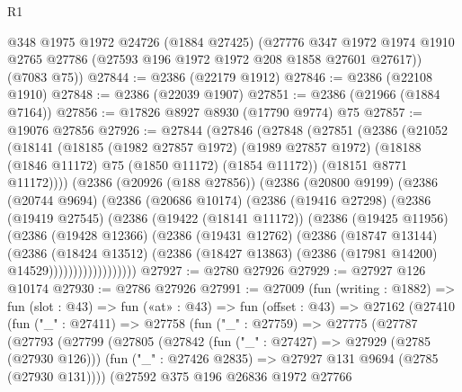 \begin{lexlean}{R1}
\begin{coremodule}
      @348
      @1975
      @1972
      @24726
      (@1884 @27425)
      (@27776
        @347
        @1972
        @1974
        @1910
        @2765
        @27786
        (@27593 @196 @1972 @1972 @208 @1858 @27601 @27617))
      (@7083 @75))
@27844 := @2386 (@22179 @1912)
@27846 := @2386 (@22108 @1910)
@27848 := @2386 (@22039 @1907)
@27851 := @2386 (@21966 (@1884 @7164))
@27856 := @17826 @8927 @8930 (@17790 @9774) @75
@27857 := @19076 @27856
@27926 := @27844
    (@27846
      (@27848
        (@27851
          (@2386
            (@21052
              (@18141
                (@18185
                  (@1982 @27857 @1972)
                  (@1989 @27857 @1972)
                  (@18188 (@1846 @11172) @75 (@1850 @11172) (@1854 @11172))
                  (@18151 @8771 @11172))))
            (@2386
              (@20926 (@188 @27856))
              (@2386
                (@20800 @9199)
                (@2386
                  (@20744 @9694)
                  (@2386
                    (@20686 @10174)
                    (@2386
                      (@19416 @27298)
                      (@2386
                        (@19419 @27545)
                        (@2386
                          (@19422 (@18141 @11172))
                          (@2386
                            (@19425 @11956)
                            (@2386
                              (@19428 @12366)
                              (@2386
                                (@19431 @12762)
                                (@2386
                                  (@18747 @13144)
                                  (@2386
                                    (@18424 @13512)
                                    (@2386
                                      (@18427 @13863)
                                      (@2386 (@17981 @14200) @14529))))))))))))))))))
@27927 := @2780 @27926
@27929 := @27927 @126 @10174
@27930 := @2786 @27926
@27991 := @27009
    (fun (writing : @1882) =>
    fun (slot : @43) =>
    fun («at» : @43) =>
    fun (offset : @43) =>
    @27162
      (@27410
        (fun ("_" : @27411) =>
        @27758
          (fun ("_" : @27759) =>
          @27775
            (@27787
              (@27793
                (@27799
                  (@27805
                    (@27842
                      (fun ("_" : @27427) => @27929 (@2785 (@27930 @126)))
                      (fun ("_" : @27426 @2835) => @27927 @131 @9694 (@2785 (@27930 @131))))
                    (@27592
                      @375
                      @196
                      @26836
                      @1972
                      @27766

\end{coremodule}
\end{lexlean}
